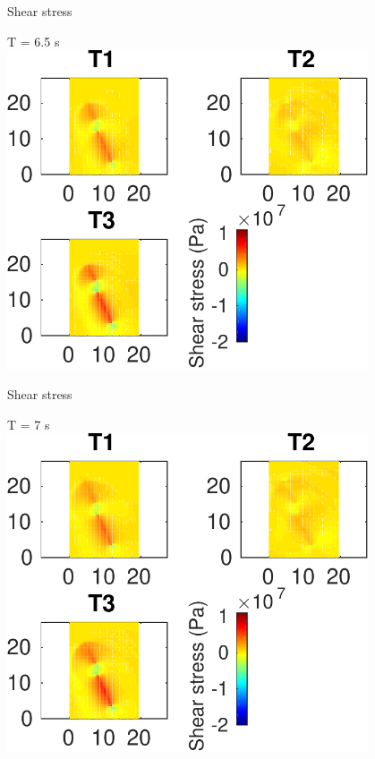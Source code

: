 \documentclass{beamer}
\begin{document}
\begin{frame}
 {Shear stress}
 
 \centering \Large T = 6.5 s\\
 \includegraphics[width=0.8\textwidth]{images/horizontal_00071}
 
\end{frame}

\begin{frame}
 {Shear stress}
 
 \centering \Large T = 7 s\\
 \includegraphics[width=0.8\textwidth]{images/horizontal_00076}
 
\end{frame}
\end{document}
